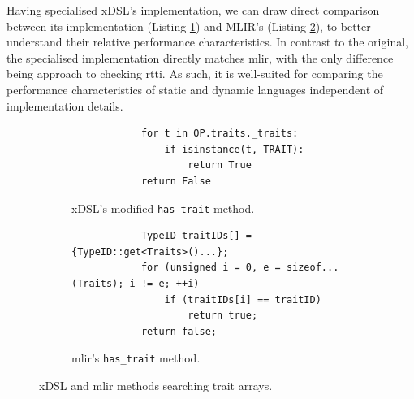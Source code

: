 Having specialised xDSL's implementation, we can draw direct comparison between its implementation (Listing \ref{listing:ubenchmark-trait-checks-both-xdsl}) and MLIR's (Listing \ref{listing:ubenchmark-trait-checks-both-mlir}), to better understand their relative performance characteristics.
In contrast to the original, the specialised implementation directly matches \ac{mlir}, with the only difference being approach to checking \ac{rtti}.
As such, it is well-suited for comparing the performance characteristics of static and dynamic languages independent of implementation details.

\begin{figure}[H]
    \centering
    \begin{subfigure}[b]{0.45\textwidth}
       \centering
        \begin{verbatim}
            for t in OP.traits._traits:
                if isinstance(t, TRAIT):
                    return True
            return False
        \end{verbatim}
        \footnotesize\vspace{2em}
        \captionsetup{name=Listing}
        \caption{xDSL's modified \texttt{has_trait} method.}
        \label{listing:ubenchmark-trait-checks-both-xdsl}
    \end{subfigure}
    \hfill
    \begin{subfigure}[b]{0.45\textwidth}
        \centering
        \begin{verbatim}
            TypeID traitIDs[] = {TypeID::get<Traits>()...};
            for (unsigned i = 0, e = sizeof...(Traits); i != e; ++i)
                if (traitIDs[i] == traitID)
                    return true;
            return false;
        \end{verbatim}
        \captionsetup{name=Listing}
        \caption{\ac{mlir}'s \texttt{has_trait} method.}
        \label{listing:ubenchmark-trait-checks-both-mlir}
    \end{subfigure}
    \vspace{1em}
    \captionsetup{name=Listing}
    \caption{xDSL and \ac{mlir} methods searching trait arrays.}
    \label{listing:ubenchmark-trait-checks-both}
\end{figure}

